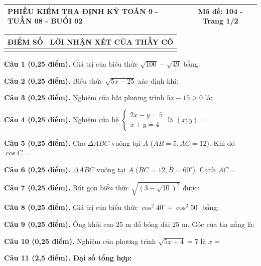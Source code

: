 \documentclass[12pt,a4paper]{article}
\begin{document}
\noindent
\begin{tabularx}{\linewidth}{|X|c|}
\hline
\textbf{PHIẾU KIỂM TRA ĐỊNH KỲ TOÁN 9 - TUẦN 08 - BUỔI 02} & \textbf{Mã đề: 104 - Trang 1/2} \\
\hline
\end{tabularx}

\vspace{1.0mm}

\noindent
\begin{tabularx}{\linewidth}{|p{3.2cm}|X|}
\hline
\centering\textbf{ĐIỂM SỐ} & \centering\textbf{LỜI NHẬN XÉT CỦA THẦY CÔ} \tabularnewline
\hline
\rule{0pt}{1.8cm} & \tabularnewline
\hline
\end{tabularx}

\vspace{1.2mm}
\noindent\textbf{Câu 1 (0,25 điểm).} Giá trị của biểu thức $\sqrt{100} - \sqrt{49}$ bằng: \par\vspace{0.5mm}
\noindent\textbf{Câu 2 (0,25 điểm).} Biểu thức $\sqrt{5x - 25}$ xác định khi: \par\vspace{0.5mm}
\noindent\textbf{Câu 3 (0,25 điểm).} Nghiệm của bất phương trình $5x - 15 \ge 0$ là: \par\vspace{0.5mm}
\noindent\textbf{Câu 4 (0,25 điểm).} Nghiệm của hệ $\begin{cases} 2x - y = 5 \\ x + y = 4 \end{cases}$ là $(x; y) =$ \par\vspace{0.5mm}
\noindent\textbf{Câu 5 (0,25 điểm).} Cho $\Delta ABC$ vuông tại $A$ ($AB=5, AC=12$). Khi đó $\cos C =$ \par\vspace{0.5mm}
\noindent\textbf{Câu 6 (0,25 điểm).} $\Delta ABC$ vuông tại $A$ ($BC = 12, \widehat{B}=60^\circ$). Cạnh $AC =$ \par\vspace{0.5mm}
\noindent\textbf{Câu 7 (0,25 điểm).} Rút gọn biểu thức $\sqrt{(3 - \sqrt{10})^2}$ được: \par\vspace{0.5mm}
\noindent\textbf{Câu 8 (0,25 điểm).} Giá trị của biểu thức $\cos^2 40^\circ + \cos^2 50^\circ$ bằng: \par\vspace{0.5mm}
\noindent\textbf{Câu 9 (0,25 điểm).} Ống khói cao $25\text{ m}$ đổ bóng dài $25\text{ m}$. Góc của tia nắng là: \par\vspace{0.5mm}
\noindent\textbf{Câu 10 (0,25 điểm).} Nghiệm của phương trình $\sqrt{5x + 4} = 7$ là $x =$ \par\vspace{0.5mm}
\vspace{0.8mm}
\noindent\textbf{Câu 11 (2,5 điểm). Đại số tổng hợp:}
\vspace{0.6mm}
\end{document}
